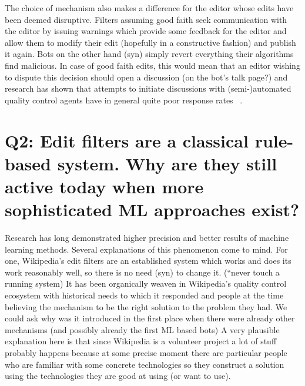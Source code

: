 The choice of mechanism also makes a difference for the editor whose edits have been deemed disruptive.
Filters assuming good faith seek communication with the editor by issuing warnings which provide some feedback for the editor and allow them to modify their edit (hopefully in a constructive fashion) and publish it again.
Bots on the other hand (syn) simply revert everything their algorithms find malicious. %
In case of good faith edits, this would mean that an editor wishing to dispute this decision should open a discussion (on the bot's talk page?) and research has shown that attempts to initiate discussions with (semi-)automated quality control agents have in general quite poor response rates ~\cite{HalGeiMorRied2013}.


\section{Q2: Edit filters are a classical rule-based system. Why are they still active today when more sophisticated ML approaches exist?}

Research has long demonstrated higher precision and better results of machine learning methods. %
Several explanations of this phenomenon come to mind.
For one, Wikipedia's edit filters are an established system which works and does its work reasonably well, so there is no need (syn) to change it. (``never touch a running system)
It has been organically weaven in Wikipedia's quality control ecosystem with historical needs to which it responded and people at the time believing the mechanism to be the right solution to the problem they had.
We could ask why was it introduced in the first place when there were already other mechanisms (and possibly already the first ML based bots) %
A very plausible explanation here is that since Wikipedia is a volunteer project a lot of stuff probably happens because at some precise moment there are particular people who are familiar with some concrete technologies so they construct a solution using the technologies they are good at using (or want to use).

